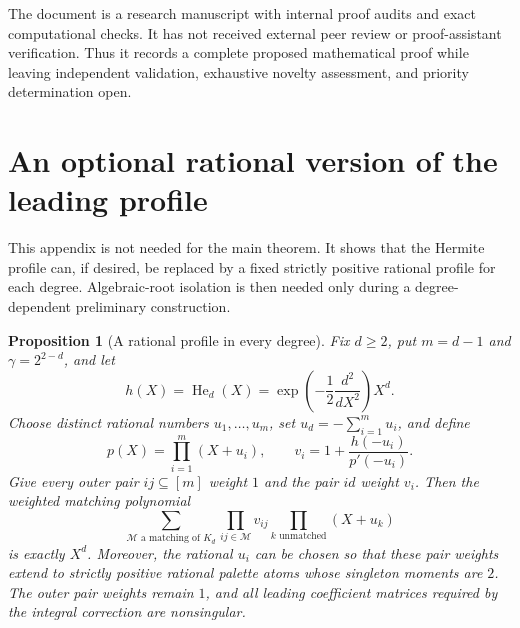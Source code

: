 \documentclass[11pt,a4paper]{article}
\newtheorem{proposition}[theorem]{Proposition}
\theoremstyle{definition}
\begin{document}
The document is a research manuscript with internal proof audits and
exact computational checks. It has not received external peer review
or proof-assistant verification. Thus it records a complete proposed
mathematical proof while leaving independent validation, exhaustive
novelty assessment, and priority determination open.

\appendix
\section{An optional rational version of the leading profile}
\label{app:rational-profile}

This appendix is not needed for the main theorem. It shows that the
Hermite profile can, if desired, be replaced by a fixed strictly positive
rational profile for each degree. Algebraic-root isolation is then needed
only during a degree-dependent preliminary construction.

\begin{proposition}[A rational profile in every degree]
\label{prop:rational-profile}
Fix $d\ge2$, put $m=d-1$ and $\gamma=2^{2-d}$, and let
\[
 h(X)=\operatorname{He}_d(X)
     =\exp\!\left(-\frac12\frac{d^2}{dX^2}\right)X^d.
\]
Choose distinct rational numbers $u_1,\ldots,u_m$, set
$u_d=-\sum_{i=1}^m u_i$, and define
\begin{equation}\label{eq:rational-star}
 p(X)=\prod_{i=1}^m(X+u_i),\qquad
 v_i=1+\frac{h(-u_i)}{p'(-u_i)}.
\end{equation}
Give every outer pair $ij\subseteq[m]$ weight $1$ and the pair $id$
weight $v_i$. Then the weighted matching polynomial
\[
 \sum_{\mathcal M\text{ a matching of }K_d}
       \prod_{ij\in\mathcal M}v_{ij}
       \prod_{k\text{ unmatched}}(X+u_k)
\]
is exactly $X^d$.
Moreover, the rational $u_i$ can be chosen so that these pair weights
extend to strictly positive rational palette atoms whose singleton
moments are $2$. The outer pair weights remain $1$, and all leading
coefficient matrices required by the integral correction are nonsingular.
\end{proposition}
\end{document}
